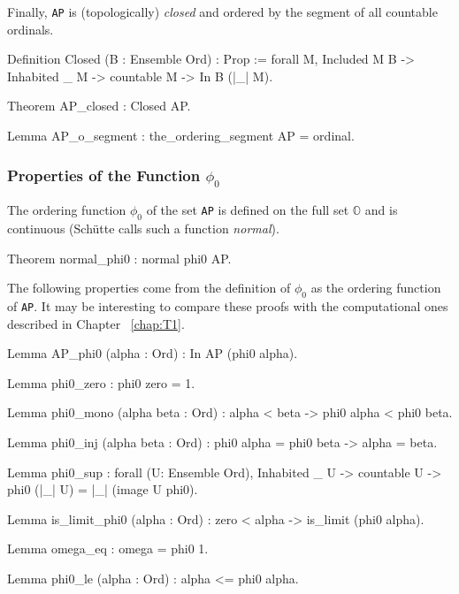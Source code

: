 {Finally, \texttt{AP} is (topologically) \emph{closed} and ordered by the segment of all countable ordinals.


\begin{Coqsrc} 
Definition Closed (B : Ensemble Ord) : Prop := 
  forall M, Included M B -> Inhabited _ M -> 
                 countable M -> In B (|_| M).
\end{Coqsrc}

\begin{Coqsrc}
Theorem AP_closed : Closed AP.

Lemma AP_o_segment :  the_ordering_segment AP = ordinal.
\end{Coqsrc}

\subsubsection{Properties of the Function \texorpdfstring{$\phi_0$}{phi0}}
 
The ordering function $\phi_0$ of the set \texttt{AP} is defined on the full set $\mathbb{O}$ and is continuous (Schütte calls such a  function  \emph{normal}).

\begin{Coqsrc}
Theorem normal_phi0 : normal phi0 AP.
\end{Coqsrc}

The following properties come from  the definition of $\phi_0$ as the ordering function of \texttt{AP}. It may be interesting to compare these proofs with the computational ones described in Chapter ~\ref{chap:T1}.

\begin{Coqsrc}
Lemma AP_phi0 (alpha : Ord) : In AP (phi0 alpha).

Lemma phi0_zero : phi0 zero =  1.

Lemma phi0_mono (alpha beta : Ord) :
  alpha < beta ->  phi0 alpha < phi0 beta.

Lemma phi0_inj (alpha beta : Ord) :
    phi0 alpha = phi0 beta -> alpha = beta.

Lemma phi0_sup : forall (U: Ensemble Ord),
   Inhabited _ U ->   countable U ->  phi0 (|_| U) = |_| (image U phi0).

Lemma is_limit_phi0 (alpha : Ord) :
  zero < alpha ->  is_limit (phi0 alpha).

Lemma omega_eq : omega = phi0 1. 

Lemma phi0_le (alpha : Ord) : alpha <= phi0 alpha.
\end{Coqsrc}

}
